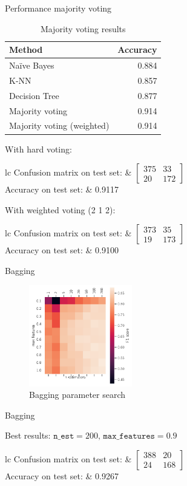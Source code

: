 \documentclass[aspectratio=169]{beamer}
\newcommand{\sresults}[2]{
\begin{table}[H]
\centering
\begin{tabular}{lc}
Confusion matrix on test set: & \( \begin{bmatrix} #1 \end{bmatrix} \) \\
    \addlinespace[0.5em]
    Accuracy on test set: & #2
\end{tabular}
\end{table}
}
\begin{document}
\begin{frame}[allowframebreaks]{Performance majority voting}
\begin{table}[H]
\centering
\caption{Majority voting results}
\begin{tabular}{lr}
\toprule
Method & Accuracy \\
\midrule
Na\"ive Bayes & 0.884 \\
K-NN & 0.857 \\
Decision Tree & 0.877 \\
\addlinespace[0.5em]
Majority voting & 0.914 \\
Majority voting (weighted)  & 0.914 \\
\bottomrule
\end{tabular}
\end{table}

\framebreak

With hard voting:
\sresults{ 375 &  33 \\ 20 & 172 }{ 0.9117 }

\noindent
With weighted voting (2 1 2):
\sresults{ 373 &  35 \\ 19 & 173 }{ 0.9100 }
\end{frame}

\begin{frame}{Bagging}
\begin{figure}[H]
\centering
\includegraphics[width=0.4\textwidth]{bagging}
\caption{Bagging parameter search}%
\label{fig:bagging}
\end{figure}

\end{frame}
\begin{frame}{Bagging}

Best results:  $\texttt{n\_est} = 200,\, \texttt{max\_features} = 0.9$

\sresults{ 388 &  20 \\ 24  & 168 }{0.9267}
\end{frame}
\end{document}
